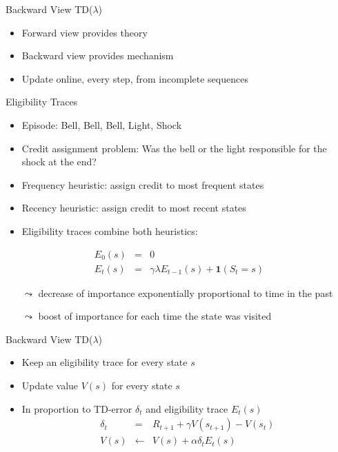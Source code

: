 \documentclass[aspectratio=169]{../latex_main/tntbeamer}  %
\begin{document}
\begin{frame}[c]{Backward View TD($\lambda$)}
	
	\begin{itemize}
		\item Forward view provides theory
		\item Backward view provides mechanism
		\item Update online, every step, from incomplete sequences
	\end{itemize}	
	
\end{frame}
\begin{frame}[c]{Eligibility Traces}
	
	\begin{itemize}
		\item Episode: Bell, Bell, Bell, Light, Shock
		\item Credit assignment problem: Was the bell or the light responsible for the shock at the end?
		\pause
		\item Frequency heuristic: assign credit to most frequent states
		\item Recency heuristic: assign credit to most recent states
		\item Eligibility traces combine both heuristics:
	\end{itemize}	

\begin{eqnarray}
E_0(s) &=& 0 \nonumber\\
E_t(s) &=& \gamma \lambda E_{t-1}(s) + \mathbf{1}(S_t=s) \nonumber
\end{eqnarray}

\begin{itemize}
	\item[$\leadsto$] decrease of importance exponentially proportional to time in the past
	\item[$\leadsto$] boost of importance for each time the state was visited
\end{itemize}
	
\end{frame}
\begin{frame}[c]{Backward View TD($\lambda$)}
	

\begin{itemize}
	\item Keep an eligibility trace for every state $s$
	\item Update value $V(s)$ for every state $s$
	\item In proportion to TD-error $\delta_t$ and eligibility trace $E_t(s)$
	\begin{eqnarray}
	\delta_t &=& R_{t+1} + \gamma V(s_{t+1}) - V(s_t)\nonumber\\
	V(s) &\gets& V(s) + \alpha \delta_t E_t(s)\nonumber
	\end{eqnarray}
\end{itemize}

\end{frame}
\end{document}
